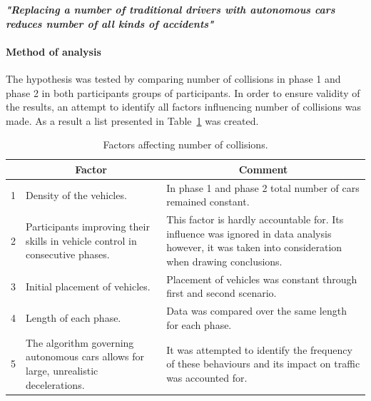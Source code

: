\documentclass[11pt,english,twoside]{article}
\begin{document}
\textbf{\textit{"Replacing a number of traditional drivers with autonomous cars reduces number of all kinds of accidents"}}

\paragraph{Method of analysis}

The hypothesis was tested by comparing number of collisions in phase 1 and phase 2 in both participants groups of participants. In order to ensure validity of the results, an attempt to identify all factors influencing number of collisions was made. As a result a list presented in Table~\ref{table:hypothesis1} was created.


\begin{table}[]
\centering
\begin{tabular}{|c|p{6.2cm}|p{6.2cm}|}
\hline
\textbf{} & \multicolumn{1}{c|}{\textbf{Factor}}                                                 & \multicolumn{1}{c|}{\textbf{Comment}}                                                                                                                \\ \hline
1         & Density of the vehicles.                                                             & In phase 1 and phase 2 total number of cars remained constant.                                                                                       \\ \hline
2         & Participants improving their skills in vehicle control in consecutive phases.        & This factor is hardly accountable for. Its influence was ignored in data analysis however, it was taken into consideration when drawing conclusions. \\ \hline
3         & Initial placement of vehicles.                                                       & Placement of vehicles was constant through first and second scenario.                                                                                \\ \hline
4         & Length of each phase.                                                                & Data was compared over the same length for each phase.                                                                                               \\ \hline
5         & The algorithm governing autonomous cars allows for large, unrealistic decelerations. & It was attempted to identify the frequency of these behaviours and its impact on traffic was accounted for.                                          \\ \hline
\end{tabular}
\caption{Factors affecting number of collisions.}
\label{table:hypothesis1}
\end{table}
\end{document}
